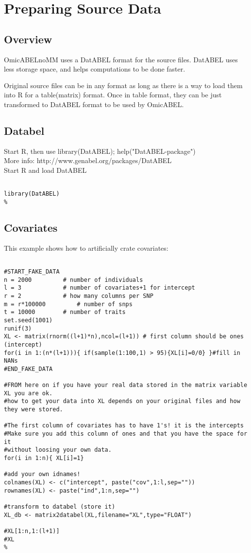 \documentclass{report}
\begin{document}
\chapter{Preparing Source Data}

\section{Overview}

OmicABELnoMM uses a DatABEL format for the source files. DatABEL uses less storage space, and helps computations to be done faster.

Original source files can be in any format as long as there is a way to load them into R for a table(matrix) format. Once in table format, they can be just transformed to DatABEL format to be used by OmicABEL.


\section{Databel}
Start R, then use library(DatABEL); help("DatABEL-package")\\
More info: http://www.genabel.org/packages/DatABEL\\
Start R and load DatABEL

\begin{lstlisting}[style=BASH,escapechar=\%]

library(DatABEL)
%
\end{lstlisting}

\section{Covariates}

This example shows how to artificially crate covariates:

\begin{lstlisting}[style=BASH,escapechar=\%]

#START_FAKE_DATA
n = 2000		 # number of individuals
l = 3   		 # number of covariates+1 for intercept
r = 2 			 # how many columns per SNP
m = r*100000		 # number of snps
t = 10000  		 # number of traits
set.seed(1001)
runif(3)
XL <- matrix(rnorm((l+1)*n),ncol=(l+1)) # first column should be ones (intercept)
for(i in 1:(n*(l+1))){ if(sample(1:100,1) > 95){XL[i]=0/0} }#fill in NANs
#END_FAKE_DATA

#FROM here on if you have your real data stored in the matrix variable XL you are ok.
#how to get your data into XL depends on your original files and how they were stored.

#The first column of covariates has to have 1's! it is the intercepts
#Make sure you add this column of ones and that you have the space for it
#without loosing your own data.
for(i in 1:n){ XL[i]=1}

#add your own idnames!
colnames(XL) <- c("intercept", paste("cov",1:l,sep=""))
rownames(XL) <- paste("ind",1:n,sep="")

#transform to databel (store it)
XL_db <- matrix2databel(XL,filename="XL",type="FLOAT")

#XL[1:n,1:(l+1)]
#XL
%
\end{lstlisting}
\end{document}
